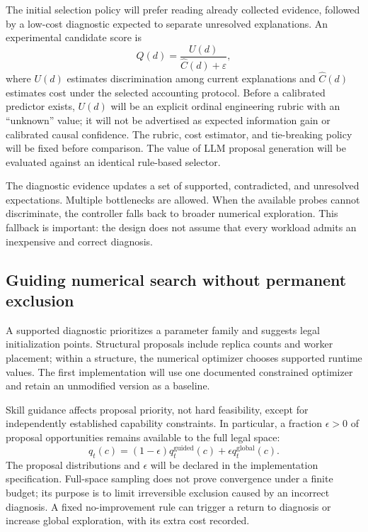 \documentclass[11pt,a4paper]{article}
\begin{document}
The initial selection policy will prefer reading already collected evidence, followed by a low-cost diagnostic expected to separate unresolved explanations. An experimental candidate score is
\begin{equation}
 Q(d)=\frac{U(d)}{\widehat C(d)+\varepsilon},
\end{equation}
where $U(d)$ estimates discrimination among current explanations and $\widehat C(d)$ estimates cost under the selected accounting protocol. Before a calibrated predictor exists, $U(d)$ will be an explicit ordinal engineering rubric with an ``unknown'' value; it will not be advertised as expected information gain or calibrated causal confidence. The rubric, cost estimator, and tie-breaking policy will be fixed before comparison. The value of LLM proposal generation will be evaluated against an identical rule-based selector.

The diagnostic evidence updates a set of supported, contradicted, and unresolved expectations. Multiple bottlenecks are allowed. When the available probes cannot discriminate, the controller falls back to broader numerical exploration. This fallback is important: the design does not assume that every workload admits an inexpensive and correct diagnosis.

\subsection{Guiding numerical search without permanent exclusion}
A supported diagnostic prioritizes a parameter family and suggests legal initialization points. Structural proposals include replica counts and worker placement; within a structure, the numerical optimizer chooses supported runtime values. The first implementation will use one documented constrained optimizer and retain an unmodified version as a baseline.

Skill guidance affects proposal priority, not hard feasibility, except for independently established capability constraints. In particular, a fraction $\epsilon>0$ of proposal opportunities remains available to the full legal space:
\begin{equation}
 q_t(c)=(1-\epsilon)q_t^{\mathrm{guided}}(c)
                 +\epsilon q_t^{\mathrm{global}}(c).
\end{equation}
The proposal distributions and $\epsilon$ will be declared in the implementation specification. Full-space sampling does not prove convergence under a finite budget; its purpose is to limit irreversible exclusion caused by an incorrect diagnosis. A fixed no-improvement rule can trigger a return to diagnosis or increase global exploration, with its extra cost recorded.
\end{document}
